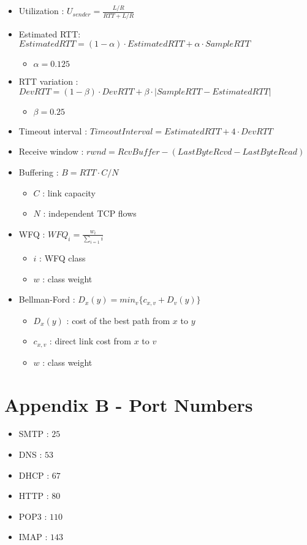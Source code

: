 \documentclass{article}
\begin{document}
\begin{itemize}
    \item Utilization : $ U_{sender} = \displaystyle\frac{L/R}{RTT + L/R} $
    \item Estimated RTT: $ EstimatedRTT = (1 - \alpha) \cdot EstimatedRTT + \alpha \cdot SampleRTT $
    \begin{itemize}
        \item $ \alpha = 0.125 $
    \end{itemize}
    \item RTT variation : $ DevRTT = (1 - \beta) \cdot DevRTT + \beta \cdot |SampleRTT - EstimatedRTT| $
    \begin{itemize}
        \item $ \beta = 0.25 $
    \end{itemize}
    \item Timeout interval : $ TimeoutInterval = EstimatedRTT + 4 \cdot DevRTT $
    \item Receive window : $ rwnd = RcvBuffer - (LastByteRcvd - LastByteRead) $
    \item Buffering : $ B = RTT \cdot C/N $
    \begin{itemize}
        \item $ C $ : link capacity
        \item $ N $ : independent TCP flows
    \end{itemize}
    \item WFQ : $ WFQ_i = \displaystyle\frac{w_i}{\sum_{i=1} i} $
    \begin{itemize}
        \item $ i $ : WFQ class
        \item $ w $ : class weight
    \end{itemize}
    \item Bellman-Ford : $ D_x(y) = min_v\{c_{x,v} + D_v(y)\}$
    \begin{itemize}
        \item $ D_x(y) $ : cost of the best path from $ x $ to $ y $
        \item $ c_{x,v} $ : direct link cost from $ x $ to $ v $
        \item $ w $ : class weight
    \end{itemize}
\end{itemize}

\section{Appendix B - Port Numbers}
\begin{itemize}
    \item SMTP : $ 25 $
    \item DNS : $ 53 $
    \item DHCP : $ 67 $
    \item HTTP : $ 80 $
    \item POP3 : $ 110 $
    \item IMAP : $ 143 $
\end{itemize}
\end{document}
